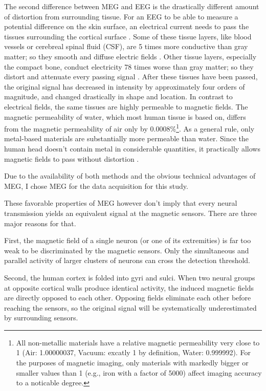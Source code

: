 The second difference between MEG and EEG is the drastically different amount of distortion from surrounding tissue.
For an EEG to be able to measure a potential difference on the skin surface, an electrical current needs to pass the tissues surrounding the cortical surface \cite{1.5.tissues.b}.
Some of these tissue layers, like blood vessels or cerebreal spinal fluid (CSF), are 5 times more conductive than gray matter; so they smooth and diffuse electric fields \cite{1.5.tissues.a}\cite{1.5.tissues.b}.
Other tissue layers, especially the compact bone, conduct electricity 78 times worse than gray matter; so they distort and attenuate every passing signal \cite{1.5.tissues.a}.
After these tissues have been passed, the original signal has decreased in intensity by approximately four orders of magnitude, and changed drastically in shape and location.
In contrast to electrical fields, the same tissues are highly permeable to magnetic fields.
The magnetic permeability of water, which most human tissue is based on, differs from the magnetic permeability of air only by 0.0008\%\footnote{All non-metallic materials have a relative magnetic permeability very close to 1 (Air: 1.00000037\cite{1.5.magneticProperties}, Vacuum: excatly 1 by definition, Water: 0.999992\cite{1.5.magneticProperties}). For the purposes of magnetic imaging, only materials with markedly bigger or smaller values than 1 (e.g., iron with a factor of 5000\cite{1.5.magneticProperties}) affect imaging accuracy to a noticable degree.}.
As a general rule, only metal-based materials are substantially more permeable than water.
Since the human head doesn't contain metal in considerable quantities, it practically allows magnetic fields to pass without distortion \cite{1.5.tissues.a}.

Due to the availability of both methods and the obvious technical advantages of MEG, I chose MEG for the data acquisition for this study.


These favorable properties of MEG however don't imply that every neural transmission yields an equivalent signal at the magnetic sensors.
There are three major reasons for that.

First, the magnetic field of a single neuron (or one of its extremities) is far too weak to be discriminated by the magnetic sensors.
Only the simultaneous and parallel activity of larger clusters of neurons can cross the detection threshold.

Second, the human cortex is folded into gyri and sulci.
When two neural groups at opposite cortical walls produce identical activity, the induced magnetic fields are directly opposed to each other.
Opposing fields eliminate each other before reaching the sensors, so the original signal will be systematically underestimated by surrounding sensors.

